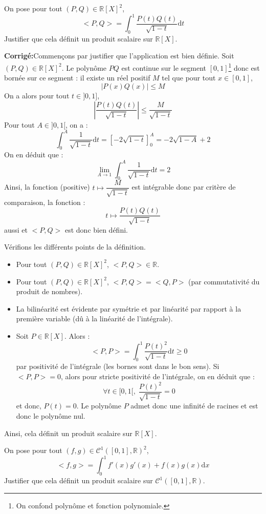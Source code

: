 \documentclass[a4paper,twoside,french,11pt]{VcCours}
\newcommand{\dx}{\text{d}x}
\newcommand{\dt}{\text{d}t}
\newcommand{\corr}{\textbf{Corrigé:}}
\begin{document}
\begin{Exercice}{}\label{PS} On pose pour tout $(P,Q) \in \mathbb{R}[X]^2$,
$$ <P,Q> = \int_{0}^1 \dfrac{P(t)Q(t)}{\sqrt{1-t}} \dt $$
Justifier que cela définit un produit scalaire sur $\mathbb{R}[X]$.
\end{Exercice}

\corr Commençons par justifier que l'application est bien définie. Soit $(P,Q) \in \mathbb{R}[X]^2$. Le polynôme $PQ$ est continue sur le segment $[0,1]$\footnote{On confond polynôme et fonction polynomiale.} donc est bornée sur ce segment : il existe un réel positif $M$ tel que pour tout $x \in [0,1]$,
$$ \vert P(x)Q(x) \vert \leq M$$
On a alors pour tout $t \in ]0,1]$,
$$ \left\vert  \dfrac{P(t)Q(t)}{\sqrt{1-t}} \right\vert \leq \dfrac{M}{\sqrt{1-t}}$$
Pour tout $A \in ]0,1[$, on a :
$$ \int_{0}^A \dfrac{1}{\sqrt{1-t}} \dt = [-2 \sqrt{1-t}]_0^A = - 2 \sqrt{1-A}+2$$
On en déduit que :
$$ \lim_{A \rightarrow 1}  \int_{0}^A \dfrac{1}{\sqrt{1-t}} \dt = 2$$
Ainsi, la fonction (positive) $t \mapsto \dfrac{M}{\sqrt{1-t}}$ est intégrable donc par critère de comparaison, la fonction :
$$ t \mapsto  \dfrac{P(t)Q(t)}{\sqrt{1-t}} $$
aussi et $<P,Q>$ est donc bien défini.


\noindent Vérifions les différents points de la définition.

\begin{itemize}
\item Pour tout $(P,Q) \in \mathbb{R}[X]^2$, $<P,Q> \in \mathbb{R}$.
\item Pour tout $(P,Q) \in \mathbb{R}[X]^2$, $<P,Q>= <Q,P>$ (par commutativité du produit de nombres).
\item La bilinéarité est évidente par symétrie et par linéarité par rapport à la première variable (dû à la linéarité de l'intégrale).
\item Soit $P \in \mathbb{R}[X]$. Alors :
$$ <P,P> =\int_0^1 \dfrac{P(t)^2}{\sqrt{1-t}} \dt \geq 0$$
par positivité de l'intégrale (les bornes sont dans le bon sens). Si $<P,P>=0$, alors pour stricte positivité de l'intégrale, on en déduit que :
$$ \forall t \in [0,1[, \; \dfrac{P(t)^2}{\sqrt{1-t}}=0$$
et donc, $P(t)=0$. Le polynôme $P$ admet donc une infinité de racines et est donc le polynôme nul. 
\end{itemize}
Ainsi, cela définit un produit scalaire sur $\mathbb{R}[X]$.


\begin{Exercice}{} \label{PS2} On pose pour tout $(f,g) \in \mathcal{C}^1([0,1],\mathbb{R})^2$,
$$ <f,g> = \int_{0}^1 f'(x)g'(x)+f(x)g(x) \dx$$
Justifier que cela définit un produit scalaire sur $\mathcal{C}^1([0,1],\mathbb{R})$.
\end{Exercice} 
\end{document}
